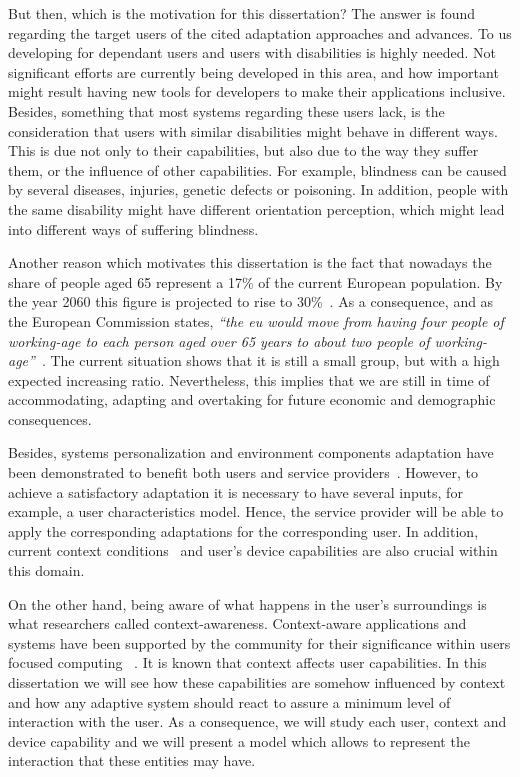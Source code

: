 But then, which is the motivation for this dissertation? The answer is found
regarding the target users of the cited adaptation approaches and advances.
To us developing for dependant users and users with disabilities is highly 
needed. Not significant efforts are currently being developed in this area, and 
how important might result having new tools for developers to make their 
applications inclusive. Besides, something that most systems regarding these 
users lack, is the consideration that users with similar disabilities might 
behave in different ways. This is due not only to their capabilities, but also 
due to the way they suffer them, or the influence of other capabilities. For 
example, blindness can be caused by several diseases, injuries, genetic defects 
or poisoning. In addition, people with the same disability might have different 
orientation perception, which might lead into different ways of suffering 
blindness.

Another reason which motivates this dissertation is the fact that nowadays the
share of people aged 65 represent a 17\% of the current European population. By
the year 2060 this figure is projected to rise to 30\%~\citep{european_comission_2012}.
As a consequence, and as the European Commission states, \textit{``the \ac{eu} 
would move from having four people of working-age to each person aged over 65 
years to about two people of working-age''}~\citep{european_comission_2012}.
The current situation shows that it is still a small group, but with a high 
expected increasing ratio. Nevertheless, this implies that we are still in time 
of accommodating, adapting and overtaking for future economic and demographic 
consequences.

Besides, systems personalization and environment components adaptation have been
demonstrated to benefit both users and service providers~\citep{kobsa_generic_2001}.
However, to achieve a satisfactory adaptation it is necessary to have several
inputs, for example, a user characteristics model. Hence, the service provider
will be able to apply the corresponding adaptations for the corresponding user.
In addition, current context conditions~\citep{jameson_modelling_2001} and user's
device capabilities are also crucial within this domain. 

On the other hand, being aware of what happens in the user's surroundings is what
researchers called context-awareness. Context-aware applications and systems have
been supported by the community for their significance within users focused
computing~\citep{schilit_context_aware_1994} \citep{chen_survey_2000}. It is
known that context affects user capabilities. In this dissertation we will see
how these capabilities are somehow influenced by context and how any adaptive
system should react to assure a minimum level of interaction with the user. As a
consequence, we will study each user, context and device capability and we will
present a model which allows to represent the interaction that these entities
may have. 

